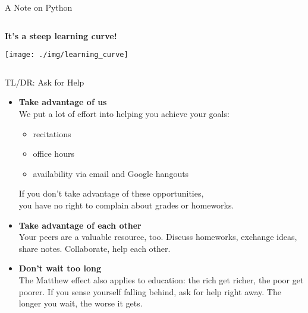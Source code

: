 \documentclass[professionalfonts, xcolor={usenames,svgnames,x11names,table}]{beamer}
\begin{document}
\begin{frame}{A Note on Python }

\begin{columns}
\begin{column}{0.5\textwidth}
  \textbf{It's a steep learning curve!}
        \begin{itemize}
        \end{itemize}
        \vspace{0.5cm}
          \texttt{[image: ./img/learning\_curve]}
\end{column}
\begin{column}{0.5\textwidth}
\end{column}
\end{columns}
\end{frame}


\begin{frame}{TL/DR: Ask for Help}
    \begin{itemize}
        \item \textbf{Take advantage of us}\\
            We put a lot of effort into helping you achieve your goals:
            \begin{itemize}
                \item recitations
                \item office hours
                \item availability via email and Google hangouts
            \end{itemize}
            If you don't take advantage of these opportunities,\\
            you have no right to complain about grades or homeworks. 
            
        \item \textbf{Take advantage of each other}\\
            Your peers are a valuable resource, too.
            Discuss homeworks, exchange ideas, share notes.
            Collaborate, help each other.

        \item \textbf{Don't wait too long}\\
            The Matthew effect also applies to education: the rich get richer, the poor get poorer.
            If you sense yourself falling behind, ask for help right away.
            The longer you wait, the worse it gets.
    \end{itemize}
\end{frame}
\end{document}
